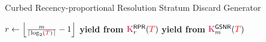 \begin{algorithm}
\caption{Curbed Recency-proportional Resolution Stratum Discard Generator}
\label{alg:curbed-recency-proportional-algo-gen-drop-ranks}
\begin{algorithmic}[1]
\Ensure{ $\colorTbar \in [0 \twodots \colorT)$ -- data items to drop, if any }    
\State $r \gets \left\lfloor \frac{m}{\left\lceil \log_2(\colorT) \right\rceil} - 1 \right\rfloor$
  \State \textbf{yield from} $\colorK^{\mathsf{RPR}}_r(\colorT)$
  \State \textbf{yield from} $\colorK^{\mathsf{GSNR}}_m(\colorT)$
\EndIf
\end{algorithmic}
\end{algorithm}
